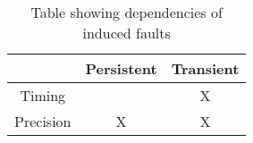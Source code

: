 \begin{table}[h!]
\centering
\begin{tabular}{|c|c|c|}
\hline  & Persistent & Transient \\ 
\hline Timing &  & X \\ 
\hline Precision & X & X \\ 
\hline 
\end{tabular} 
\caption{Table showing dependencies of induced faults}
\label{tab:dependencies}
\end{table}

